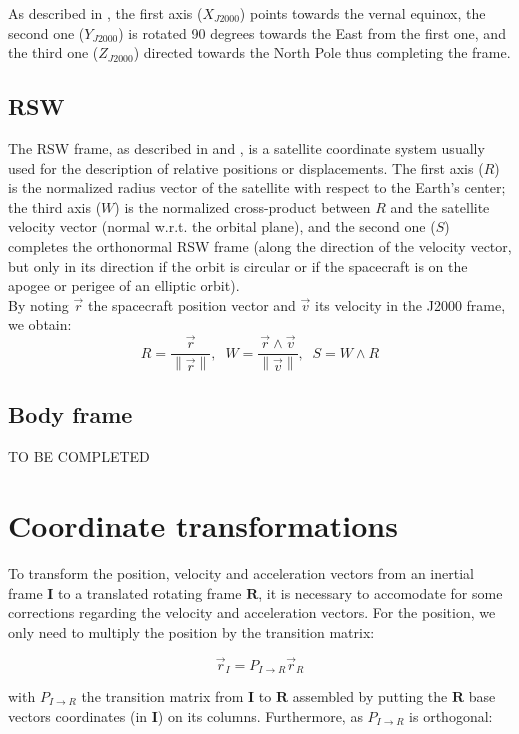 \documentclass{article}
\newcommand{\norm}[1]{\left\lVert#1\right\rVert}
\begin{document}
As described in \cite{book:911134}, the first axis ($X_{J2000}$) points towards the vernal equinox, the second one ($Y_{J2000}$) is rotated 90 degrees towards the East from the first one, and the third one ($Z_{J2000}$) directed towards the North Pole thus completing the frame.

\subsection{RSW}

The RSW frame, as described in \cite{vallado2004covariance} and \cite{book:911134}, is a satellite coordinate system usually used for the description of relative positions or displacements. The first axis ($R$) is the normalized radius vector of the satellite with respect to the Earth's center; the third axis ($W$) is the normalized cross-product between $R$ and the satellite velocity vector (normal w.r.t. the orbital plane), and the second one ($S$) completes the orthonormal RSW frame (along the direction of the velocity vector, but only in its direction if the orbit is circular or if the spacecraft is on the apogee or perigee of an elliptic orbit). \\
By noting $\vec{r}$ the spacecraft position vector and $\vec{v}$ its velocity in the J2000 frame, we obtain:
\[ R = \frac{\vec{r}}{\norm{\vec{r}}}, \;\; W = \frac{\vec{r}\wedge \vec{v}}{\norm{\vec{v}}}, \; \; S = W \wedge R \]

\subsection{Body frame}

TO BE COMPLETED

\section{Coordinate transformations}

To transform the position, velocity and acceleration vectors from an inertial frame $\bm{I}$ to a translated rotating frame $\bm{R}$, it is necessary to accomodate for some corrections regarding the velocity and acceleration vectors. For the position, we only need to multiply the position by the transition matrix:

\begin{equation}
\vec{r}_I = P_{I \rightarrow R}\vec{r}_R
\end{equation}

with $P_{I \rightarrow R}$ the transition matrix from $\bm{I}$ to $\bm{R}$ assembled by putting the $\bm{R}$ base vectors coordinates (in $\bm{I}$) on its columns. Furthermore, as $P_{I \rightarrow R}$ is orthogonal:
\end{document}
